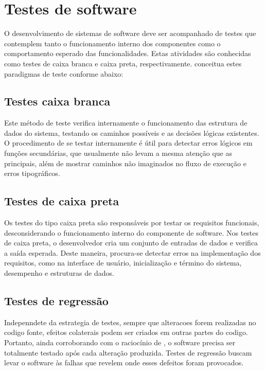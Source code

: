 \section{Testes de software}

O desenvolvimento de sistemas de software deve ser acompanhado de testes que contemplem tanto o funcionamento interno dos componentes como o comportamento esperado das funcionalidades. Estas atividades são conhecidas como testes de caixa branca e caixa preta, respectivamente.  conceitua estes paradigmas de teste conforme abaixo:

\subsection{Testes caixa branca}

Este método de teste verifica internamente o funcionamento das estrutura de dados do sistema, testando os caminhos possíveis e as decisões lógicas existentes. O procedimento de se testar internamente é útil para detectar erros lógicos em funções secundárias, que usualmente não levam a mesma atenção que as principais, além de mostrar caminhos não imaginados no fluxo de execução e erros tipográficos.

\subsection{Testes de caixa preta}

Os testes do tipo caixa preta são responsáveis por testar os requisitos funcionais, desconsiderando o funcionamento interno do componente de software. Nos testes de caixa preta, o desenvolvedor cria um conjunto de entradas de dados e verifica a saída esperada. Deste maneira, procura-se detectar erros na implementação dos requisitos, como na interface de usuário, inicialização e término do sistema, desempenho e estruturas de dados.

\subsection{Testes de regressão}
Indepenndete da estrategia de testes, sempre que alteracoes forem realizadas no codigo fonte, efeitos colaterais podem ser criados em outras partes do codigo. Portanto, ainda corroborando com o raciocínio de , o software precisa ser totalmente testado após cada alteração produzida. Testes de regressão buscam levar o software às falhas que revelem onde esses defeitos foram provocados.


